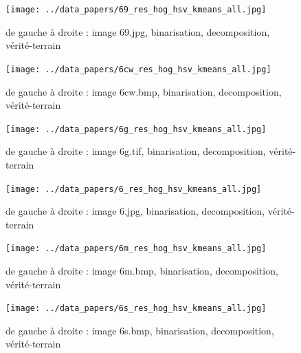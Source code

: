 \documentclass{book}
\begin{document}
\begin{figure}[H]
\begin{center}
\texttt{[image: ../data\_papers/69\_res\_hog\_hsv\_kmeans\_all.jpg]}
\end{center}
\caption{de gauche à droite : image 69.jpg, binarisation, decomposition, vérité-terrain}
\label{69}
\end{figure}
\clearpage


\begin{figure}[H]
\begin{center}
\texttt{[image: ../data\_papers/6cw\_res\_hog\_hsv\_kmeans\_all.jpg]}
\end{center}
\caption{de gauche à droite : image 6cw.bmp, binarisation, decomposition, vérité-terrain}
\label{6cw}
\end{figure}
\clearpage


\begin{figure}[H]
\begin{center}
\texttt{[image: ../data\_papers/6g\_res\_hog\_hsv\_kmeans\_all.jpg]}
\end{center}
\caption{de gauche à droite : image 6g.tif, binarisation, decomposition, vérité-terrain}
\label{6g}
\end{figure}
\clearpage


\begin{figure}[H]
\begin{center}
\texttt{[image: ../data\_papers/6\_res\_hog\_hsv\_kmeans\_all.jpg]}
\end{center}
\caption{de gauche à droite : image 6.jpg, binarisation, decomposition, vérité-terrain}
\label{6}
\end{figure}
\clearpage


\begin{figure}[H]
\begin{center}
\texttt{[image: ../data\_papers/6m\_res\_hog\_hsv\_kmeans\_all.jpg]}
\end{center}
\caption{de gauche à droite : image 6m.bmp, binarisation, decomposition, vérité-terrain}
\label{6m}
\end{figure}
\clearpage


\begin{figure}[H]
\begin{center}
\texttt{[image: ../data\_papers/6s\_res\_hog\_hsv\_kmeans\_all.jpg]}
\end{center}
\caption{de gauche à droite : image 6s.bmp, binarisation, decomposition, vérité-terrain}
\label{6s}
\end{figure}
\clearpage
\end{document}
